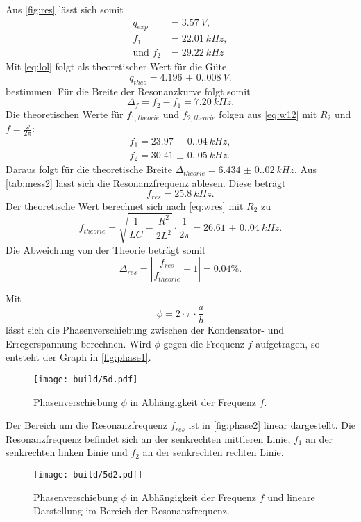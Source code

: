 Aus \autoref{fig:res} lässt sich somit
\begin{align*}
  q_{exp} &= \SI{3.57}{V}, \\
  f_1 &= \SI{22.01}{kHz}, \\
  \text{und } f_2 &= \SI{29.22}{kHz}
\end{align*}
Mit \autoref{eq:lol} folgt als theoretischer Wert für die Güte
\begin{equation}
  q_{theo} = \SI{4.196(0.008)}{V}.
\end{equation}
bestimmen. Für die Breite der Resonanzkurve folgt somit
\begin{equation*}
  \Delta_f = f_2 - f_1 = \SI{7.20}{kHz}.
\end{equation*}
\newpage
Die theoretischen Werte für $f_{1, theorie}$ und $f_{2, theorie}$ folgen aus \autoref{eq:w12} mit $R_2$ und $f = \frac{\omega}{2\pi}$:
\begin{align*}
  f_1 = \SI{23.97(0.04)}{kHz},\\
  f_2 = \SI{30.41(0.05)}{kHz}.
\end{align*}
Daraus folgt für die theoretische Breite $\Delta_{theorie} = \SI{6.434(0.020)}{kHz}$.
Aus \autoref{tab:mess2} lässt sich die Resonanzfrequenz ablesen. Diese beträgt
\begin{equation*}
  f_{res} = \SI{25.8}{kHz}.
\end{equation*}
Der theoretische Wert berechnet sich nach \autoref{eq:wres} mit $R_2$ zu 
\begin{equation*}
  f_{theorie} = \sqrt{\frac{1}{LC} - \frac{R^2}{2L^2}} \cdot \frac{1}{2\pi} = \SI{26.61(0.04)}{kHz}.
\end{equation*}
Die Abweichung von der Theorie beträgt somit 
\begin{equation*}
  \Delta_{res} = |\frac{f_{res}}{f_{theorie}} - 1| = 0.04\%.
\end{equation*}

Mit 
\begin{equation*}
  \phi = 2 \cdot \pi \cdot \frac{a}{b}
\end{equation*}
lässt sich die Phasenverschiebung zwischen der Kondensator- und Erregerspannung berechnen.
Wird $\phi$ gegen die Frequenz $f$ aufgetragen, so entsteht der Graph in \autoref{fig:phase1}.
\begin{figure}[H]
  \texttt{[image: build/5d.pdf]}
  \caption{Phasenverschiebung $\phi$ in Abhängigkeit der Frequenz $f$.}
  \label{fig:phase1}
\end{figure}
Der Bereich um die Resonanzfrequenz $f_{res}$ ist in \autoref{fig:phase2} linear dargestellt. Die Resonanzfrequenz befindet sich an der senkrechten
mittleren Linie, $f_1$ an der senkrechten linken Linie und $f_2$ an der senkrechten rechten Linie.
\begin{figure}[H]
  \texttt{[image: build/5d2.pdf]}
  \caption{Phasenverschiebung $\phi$ in Abhängigkeit der Frequenz $f$ und lineare Darstellung im Bereich der Resonanzfrequenz.}
  \label{fig:phase2}
\end{figure}







\newpage
